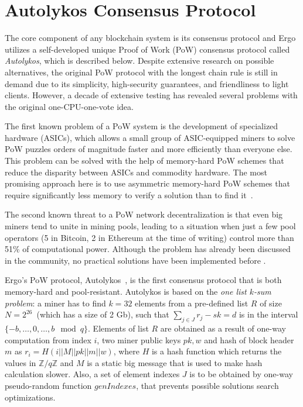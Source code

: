 \section{Autolykos Consensus Protocol}
\label{sec:autolykos}


The core component of any blockchain system is its consensus protocol and Ergo utilizes a self-developed
unique Proof of Work (PoW) consensus protocol called {\em Autolykos}, which is described below.
Despite extensive research on possible alternatives, the original PoW protocol with the longest chain rule is still in demand due to its simplicity, high-security guarantees, and friendliness to light clients.
However, a decade of extensive testing has revealed several problems with the original one-CPU-one-vote idea.

The first known problem of a PoW system is the development of specialized hardware (ASICs), which allows a small group of ASIC-equipped miners to solve PoW puzzles orders of magnitude faster and more efficiently than everyone else. This problem can be solved with the help of memory-hard PoW schemes that reduce the disparity between ASICs and commodity hardware. The most promising approach here is to use asymmetric memory-hard PoW schemes that require significantly less memory to verify a solution than to find it~\cite{biryukov2017equihash,ethHash}.

The second known threat to a PoW network decentralization is that even big miners tend to unite in
mining pools, leading to a situation when just a few pool operators (5 in Bitcoin, 2 in Ethereum
at the time of writing) control more than 51\% of computational power.
Although the problem has already been discussed in the community, no practical solutions have been
implemented before \Ergo{}.


Ergo's PoW protocol, Autolykos~\cite{Ergopow}, is the first consensus protocol that is both memory-hard
and pool-resistant.
Autolykos is based on the {\em one list $k$-sum problem}: a miner has to find
$k=32$ elements from a pre-defined list $R$ of size $N=2^{26}$~(which has a size of 2 Gb),
such that $\sum_{j \in J} r_{j} - sk = d$ is in the interval $\{-b,\dots,0,\dots,b\mod q\}$.
Elements of list $R$ are obtained as a result of one-way computation from index $i$,
two miner public keys $pk,w$ and hash of block header $m$ as $r_i=H(i||M||pk||m||w)$,
where $H$ is a hash function which returns the values in $\mathbb{Z}/q\mathbb{Z}$ and
$M$ is a static big message that is used to make hash calculation slower.
Also, a set of element indexes $J$ is to be obtained
by one-way pseudo-random function $genIndexes$, that prevents possible solutions
search optimizations.

